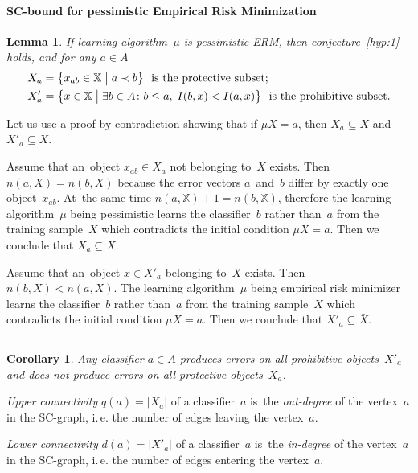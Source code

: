 \documentclass{article} %
\def\XX{\mathbb{X}}
\newcommand{\X}{\bar X}
\newtheorem{lemma}[theorem]{Lemma}
\newtheorem{corollary}[theorem]{Corollary}
\newcommand{\qed}{\hfill\rule{7pt}{7pt}}
\newenvironment{proof}{\noindent{\bf Proof:}}{\qed\medskip}
\begin{document}
\paragraph{SC-bound for pessimistic Empirical Risk Minimization}
\begin{lemma}
\label{lem:pERM}
    If learning algorithm~$\mu$ is pessimistic ERM,
    then conjecture~\ref{hyp:1} holds,
    and for any $a\in A$
    \begin{align*}
        X _a &= \bigl\{ x_{ab}\in\XX \bigm| a\prec b\bigr\}
                \text{~ is the protective subset};\\
        X'_a &= \bigl\{ x\in\XX \bigm| \exists b\in A\colon b\leq a,\; I(b,x)<I(a,x) \bigr\}
                \text{~ is the prohibitive subset}.
    \end{align*}
\end{lemma}
\begin{proof}
    Let us use a proof by contradiction showing that
    if $\mu X = a$, then $X_a\subseteq X$ and $X'_a\subseteq \X$.

    Assume that an~object $x_{ab}\in X_a$ not belonging to~$X$ exists.
    Then ${n(a,X) = n(b,X)}$ because the
    error vectors $a$~and~$b$ differ by exactly one object~$x_{ab}$.
    At~the same time  $n(a,\XX)+1 = n(b,\XX)$,
    therefore the learning algorithm~$\mu$ being pessimistic
    learns the classifier~$b$ rather than~$a$ from the training sample~$X$
    which contradicts the initial condition ${\mu X = a}$.
    Then we conclude that $X_a \subseteq X$.

    Assume that an~object $x\in X'_a$ belonging to~$X$ exists.
    Then ${n(b,X) < n(a,X)}$.
    The learning algorithm~$\mu$ being empirical risk minimizer
    learns the classifier~$b$ rather than~$a$ from the training sample~$X$
    which contradicts the initial condition ${\mu X = a}$.
    Then we conclude that $X'_a \subseteq \X$.
\end{proof}

\begin{corollary}
\label{lem:pERM:corollary}
    Any classifier $a\in A$
    produces errors on all prohibitive objects~$X'_a$ and
    does not produce errors on all protective objects~$X_a$.
\end{corollary}

\emph{Upper connectivity} $q(a)=|X_a|$ of a classifier~$a$
is~the \emph{out-degree} of the vertex~$a$ in the SC-graph,
i.\,e. the number of edges leaving the vertex~$a$.

\medskip
\emph{Lower connectivity} $d(a)=|X'_a|$ of a classifier~$a$
is~the \emph{in-degree}  of the vertex~$a$ in the SC-graph,
i.\,e. the number of edges entering the vertex~$a$.
\end{document}
